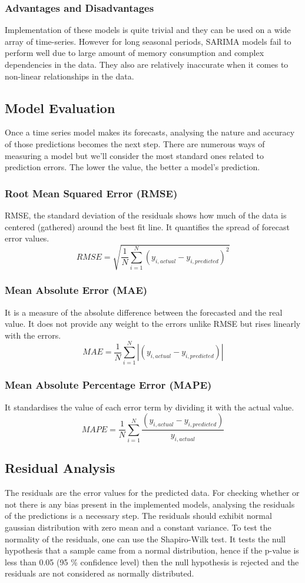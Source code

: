 \documentclass[a4paper,12pt]{article}
\begin{document}
\subsubsection{Advantages and Disadvantages}
\label{sec:org5a4b367}
Implementation of these models is quite trivial and they can be used on a wide array of time-series. However for long seasonal periods, SARIMA models fail to perform well due to large amount of memory consumption and complex dependencies in the data. They also are relatively inaccurate when it comes to non-linear relationships in the data.
\subsection{Model Evaluation}
\label{sec:orgf7b130d}
Once a time series model makes its forecasts, analysing the nature and accuracy of those predictions becomes the next step. There are numerous ways of measuring a model but we'll consider the most standard ones related to prediction errors. The lower the value, the better a model's prediction.
\subsubsection{Root Mean Squared Error (RMSE)}
\label{sec:org2d5d48c}
RMSE, the standard deviation of the residuals shows how much of the data is centered (gathered) around the best fit line. It quantifies the spread of forecast error values.
\[
  RMSE = \sqrt{\frac{1}{N}\sum_{i=1}^N (y_{i, actual} - y_{i, predicted})^{2}}
\]
\subsubsection{Mean Absolute Error (MAE)}
\label{sec:org2e88f1a}
It is a measure of the absolute difference between the forecasted and the real value. It does not provide any weight to the errors unlike RMSE but rises linearly with the errors.
\[
  MAE = \frac{1}{N}\sum_{i=1}^{N} | (y_{i, actual} - y_{i, predicted}) |
\]
\subsubsection{Mean Absolute Percentage Error (MAPE)}
\label{sec:orgd3faa92}
It standardises the value of each error term by dividing it with the actual value.
\[
  MAPE = \frac{1}{N}\sum_{i=1}^{N} \frac{(y_{i, actual} - y_{i, predicted})}{y_{i, actual}}
\]
\subsection{Residual Analysis}
\label{sec:org43a76d8}
The residuals are the error values for the predicted data. For checking whether or not there is any bias present in the implemented models, analysing the residuals of the predictions is a necessary step. The residuals should exhibit normal gaussian distribution with zero mean and a constant variance. To test the normality of the residuals, one can use the Shapiro-Wilk test. It tests the null hypothesis that a sample came from a normal distribution, hence if the p-value is less than 0.05 (95 \% confidence level) then the null hypothesis is rejected and the residuals are not considered as normally distributed.
\end{document}
